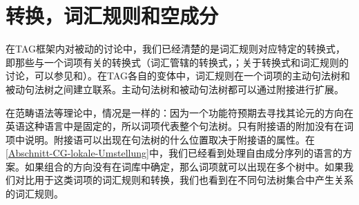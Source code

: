 \section{转换，词汇规则和空成分}
\label{Abschnitt-leere-Elemente-LRs-Transformations}

在TAG框架内对被动的讨论中，我们已经清楚的是词汇规则对应特定的转换式，即那些与一个词项有关的转换式（词汇管辖的转换式，\citealp{Dowty78a}；关于转换式和词汇规则的讨论，可以参见和）。在TAG\indextagc 各自的变体中，词汇规则在一个词项的主动句法树和被动句法树之间建立联系。主动句法树和被动句法树都可以通过附接进行扩展。

在范畴语法\indexcgc 等理论中，情况是一样的：因为一个功能符预期去寻找其论元的方向在英语这种语言中是固定的，所以词项代表整个句法树。只有附接语的附加没有在词项中说明。附接语可以出现在句法树的什么位置取决于附接语的属性。在\ref{Abschnitt-CG-lokale-Umstellung}中，我们已经看到处理自由成分序列的语言的方案。如果组合的方向没有在词库中确定，那么词项就可以出现在多个树中。如果我们对比用于这类词项的词汇规则和转换，我们也看到在不同句法树集合中产生关系的词汇规则。

